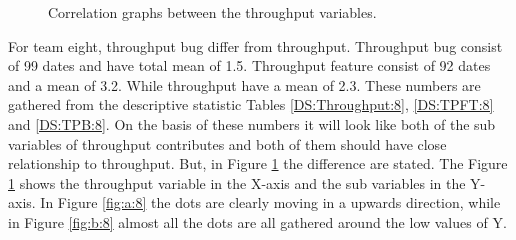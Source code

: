 \documentclass[UKenglish]{ifimaster}  %
\begin{document}
\begin{figure}[h]
\centering     %
{}
\caption{Correlation graphs between the throughput variables.}
\label{corr:Difference:8}
\end{figure}


For team eight, throughput bug differ from throughput. Throughput bug consist of 99 dates and have total mean of 1.5. Throughput feature consist of 92 dates and a mean of 3.2. While throughput have a mean of 2.3. These numbers are gathered from the descriptive statistic Tables \ref{DS:Throughput:8}, \ref{DS:TPFT:8} and \ref{DS:TPB:8}.  On the basis of these numbers it will look like both of the sub variables of throughput contributes and both of them should have close relationship to throughput.  But, in Figure \ref{corr:Difference:8} the difference are stated. The Figure \ref{corr:Difference:8} shows the throughput variable in the X-axis and the sub variables in the Y-axis. In Figure \ref{fig:a:8} the dots are clearly moving in a upwards direction, while in Figure \ref{fig:b:8} almost all the dots are all gathered around the low values of Y.
 
\end{document}
